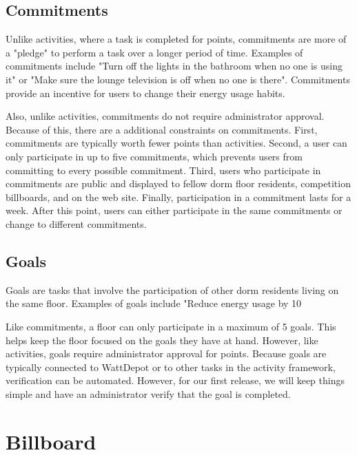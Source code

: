 \subsection{Commitments}

Unlike activities, where a task is completed for points, commitments are more of a "pledge" to perform a task over a longer period of time.  Examples of commitments include "Turn off the lights in the bathroom when no one is using it" or "Make sure the lounge television is off when no one is there".  Commitments provide an incentive for users to change their energy usage habits.

Also, unlike activities, commitments do not require administrator approval.  Because of this, there are a additional constraints on commitments.  First, commitments are typically worth fewer points than activities.  Second, a user can only participate in up to five commitments, which prevents users from committing to every possible commitment.  Third, users who participate in commitments are public and displayed to fellow dorm floor residents, competition billboards, and on the web site.  Finally, participation in a commitment lasts for a week.  After this point, users can either participate in the same commitments or change to different commitments.

\subsection{Goals}

Goals are tasks that involve the participation of other dorm residents living on the same floor.  Examples of goals include "Reduce energy usage by 10%

Like commitments, a floor can only participate in a maximum of 5 goals.  This helps keep the floor focused on the goals they have at hand.  However, like activities, goals require administrator approval for points.  Because goals are typically connected to WattDepot or to other tasks in the activity framework, verification can be automated.  However, for our first release, we will keep things simple and have an administrator verify that the goal is completed.

\section{Billboard}
\label{billboard}

